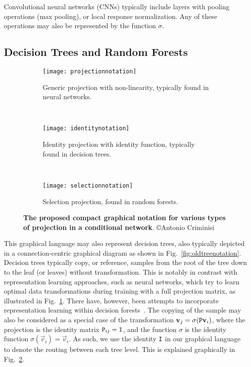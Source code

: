 \documentclass[thesis]{subfiles}
\begin{document}
Convolutional neural networks (CNNs) typically include layers with pooling operations (\eg max pooling), or local response normalization. Any of these operations may also be represented by the function $\sigma$.

\subsection{Decision Trees and Random Forests}

\begin{figure}[htbp!] 
\centering
\begin{subfigure}[b]{\textwidth}
   \centering
   \texttt{[image: projectionnotation]}
   \caption{Generic projection with non-linearity, typically found in neural networks.}
   \label{fig:projectionnotation}
\end{subfigure}
~
\begin{subfigure}[b]{\textwidth}
   \centering
   \texttt{[image: identitynotation]}
   \caption{Identity projection with identity function, typically found in decision trees.}
   \label{fig:identitynotation}
\end{subfigure}
~
\begin{subfigure}[b]{\textwidth}
   \centering
   \texttt{[image: selectionnotation]}
   \caption{Selection projection, found in random forests.}
   \label{fig:selectionnotation}
\end{subfigure}
\caption[Various projection matrices in conditional networks.]{{\bf The proposed compact graphical notation for various types of projection in a conditional network}. \copyright Antonio Criminisi}
\label{fig:projections}
\end{figure}

This graphical language may also represent decision trees, also typically depicted in a connection-centric graphical diagram as shown in Fig.~\ref{fig:oldtreenotation}. Decision trees typically copy, or reference, samples from the root of the tree down to the leaf (or leaves) without transformation. This is notably in contrast with representation learning approaches, such as neural networks, which try to learn optimal data transformations during training with a full projection matrix, as illustrated in Fig.~\ref{fig:projectionnotation}. There have, however, been attempts to incorporate representation learning within decision forests~\cite{montillo2011entangled,BuloKontsch2014}. The copying of the sample may also be considered as a special case of the transformation $\vec v_j = \sigma(\mat P \vec v_i)$, where the projection is the identity matrix $\mat P_{ij} = \mat I$, and the function $\sigma$ is the identity function $\sigma(\vec v_i) = \vec v_i$. As such, we use the identity $\mat I$ in our graphical language to denote the routing between each tree level. This is explained graphically in Fig.~\ref{fig:identitynotation}.
\end{document}
